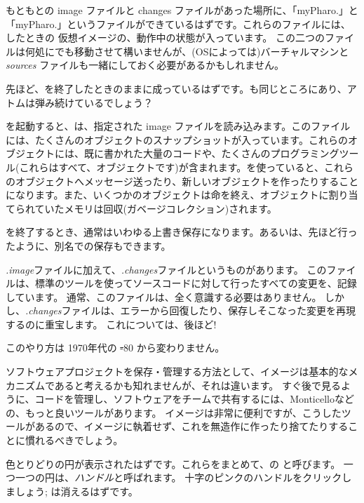 \documentclass[a4paper,10pt,twoside]{book}
\begin{document}
もともとの image ファイルと changes ファイルがあった場所に、「myPharo.」と「myPharo.」というファイルができているはずです。これらのファイルには、したときの \pharo 仮想イメージの、動作中の状態が入っています。
この二つのファイルは何処にでも移動させて構いませんが、(OSによっては)バーチャルマシンと \emph{sources} ファイルも一緒にしておく必要があるかもしれません。


先ほど、\pharo を終了したときのままに成っているはずです。\bam も同じところにあり、アトムは弾み続けているでしょう？

\pharo を起動すると、\pharo {}は、指定された image ファイルを読み込みます。このファイルには、たくさんのオブジェクトのスナップショットが入っています。これらのオブジェクトには、既に書かれた大量のコードや、たくさんのプログラミングツール(これらはすべて、オブジェクトです)が含まれます。\pharo を使っていると、これらのオブジェクトへメッセージ送ったり、新しいオブジェクトを作ったりすることになります。また、いくつかのオブジェクトは命を終え、オブジェクトに割り当てられていたメモリは回収(\ie ガベージコレクション)されます。

\pharo を終了するとき、通常はいわゆる上書き保存になります。あるいは、先ほど行ったように、別名での保存もできます。

\emph{.image}ファイルに加えて、\emph{.changes}ファイルというものがあります。
このファイルは、標準のツールを使ってソースコードに対して行ったすべての変更を、記録しています。
通常、このファイルは、全く意識する必要はありません。
しかし、\emph{.changes}ファイルは、エラーから回復したり、保存しそこなった変更を再現するのに重宝します。
これについては、後ほど!

このやり方は 1970年代の \st-80 から変わりません。

ソフトウェアプロジェクトを保存・管理する方法として、イメージは基本的なメカニズムであると考えるかも知れませんが、それは違います。
すぐ後で見るように、コードを管理し、ソフトウェアをチームで共有するには、Monticelloなどの、もっと良いツールがあります。
イメージは非常に便利ですが、こうしたツールがあるので、イメージに執着せず、これを無造作に作ったり捨てたりすることに慣れるべきでしょう。

色とりどりの円が表示されたはずです。これらをまとめて、\bam の と呼びます。
一つ一つの円は、\emph{ハンドル}と呼ばれます。
十字のピンクのハンドルをクリックしましょう; \bam は消えるはずです。
\end{document}

